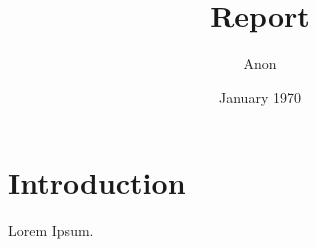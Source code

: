 \documentclass[12pt]{report}
\title{Report}
\author{Anon}
\date{January 1970}
\begin{document}
        \maketitle
        
        \tableofcontents
        \listoffigures
        \listoftables
        \titleformat{\chapter}[display]
        {\normalfont\bfseries\Huge}{}{0pt}{\thechapter\quad}

        
    \chapter{Introduction}
    \begin{flushleft}
    
    Lorem Ipsum.

\end{flushleft}
\end{document}
